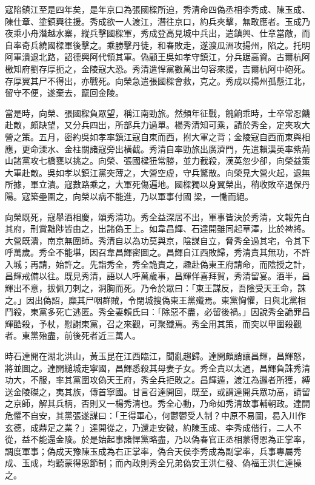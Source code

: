 \begin{pinyinscope}
寇陷鎮江至是四年矣，是年京口為張國樑所迫，秀清命四偽丞相李秀成、陳玉成、陳仕章、塗鎮興往援。秀成欲一人渡江，潛往京口，約兵夾擊，無敢應者。玉成乃夜乘小舟潛越水寨，縱兵擊國樑軍，秀成登高見城中兵出，遣鎮興、仕章當敵，而自率奇兵繞國樑軍後擊之。乘勝擊丹徒，和春敗走，遂渡瓜洲攻揚州，陷之。托明阿軍潰退北路，詔德興阿代領其軍。偽顧王吳如孝守鎮江，分兵踞高資。古爾杭阿檄知府劉存厚扼之，金陵寇大恐。秀清遣悍黨數萬出句容來援，吉爾杭阿中砲死。存厚翼其尸不得出，亦戰死。向榮急遣張國樑會救，克之。秀成以揚州孤懸江北，留守不便，遂棄去，竄回金陵。

當是時，向榮、張國樑負眾望，稱江南勁旅。然頻年征戰，餽餉乖時，士卒常忍饑赴敵，頗缺望，又分兵四出，所部兵力過單。楊秀清知可乘，請於秀全，定夾攻大營之策。五月，密約吳如孝率鎮江寇自東而西，拊大軍之背；金陵寇自西而東與相應，更命溧水、金柱關諸寇旁出橫截。秀清自率勁旅出廣濟門，先遣賴漢英率紫荊山諸黨攻七橋甕以挑之。向榮、張國樑狃常勝，並力截殺，漢英忽少卻，向榮益策大軍赴敵。吳如孝以鎮江黨突薄之，大營空虛，守兵驚散。向榮見大營火起，退無所據，軍立潰。寇數路乘之，大軍死傷遍地。國樑獨以身翼榮出，稍收敗卒退保丹陽。寇築壘圍之，向榮以病不能進，乃以軍事付國梁，一慟而絕。

向榮既死，寇舉酒相慶，頌秀清功。秀全益深居不出，軍事皆決於秀清，文報先白其府，刑賞黜陟皆由之，出諸偽王上。如韋昌輝、石達開雖同起草澤，比於裨將。大營既潰，南京無圍師。秀清自以為功莫與京，陰謀自立，脅秀全過其宅，令其下呼萬歲。秀全不能堪，因召韋昌輝密圖之。昌輝自江西敗歸，秀清責其無功，不許入城；再請，始許之。先詣秀全，秀全詭責之，趣赴偽東王府請命，而陰授之計，昌輝戒備以往。既見秀清，語以人呼萬歲事，昌輝佯喜拜賀，秀清留宴。酒半，昌輝出不意，拔佩刀刺之，洞胸而死。乃令於眾曰：「東王謀反，吾陰受天王命，誅之。」因出偽詔，糜其尸咽群賊，令閉城搜偽東王黨殲焉。東黨恟懼，日與北黨相鬥殺，東黨多死亡逃匿。秀全妻賴氏曰：「除惡不盡，必留後禍。」因說秀全詭罪昌輝酷殺，予杖，慰謝東黨，召之來觀，可聚殲焉。秀全用其策，而突以甲圍殺觀者。東黨殆盡，前後死者近三萬人。

時石達開在湖北洪山，黃玉昆在江西臨江，聞亂趨歸。達開頗誚讓昌輝，昌輝怒，將並圖之。達開縋城走寧國，昌輝悉殺其母妻子女。秀全責以太過，昌輝負誅秀清功大，不服，率其黨圍攻偽天王府，秀全兵拒敗之。昌輝遁，渡江為邏者所獲，縛送金陵磔之，夷其族，傳首寧國。甘言召達開回，既至，或謂達開兵眾功高，請留之京師，解其兵柄，否則又一楊秀清也。秀全心動，乃命如秀清故事輔朝政。達開危懼不自安，其黨張遂謀曰：「王得軍心，何鬱鬱受人制？中原不易圖，曷入川作玄德，成鼎足之業？」達開從之，乃還走安徽，約陳玉成、李秀成偕行，二人不從，益不能還金陵。於是始起事諸悍黨略盡，乃以偽春官正丞相蒙得恩為正掌率，調度軍事；偽成天豫陳玉成為右正掌率，偽合天侯李秀成為副掌率，兵事專屬秀成、玉成，均聽蒙得恩節制；而內政則秀全兄弟偽安王洪仁發、偽福王洪仁達操之。


\end{pinyinscope}
